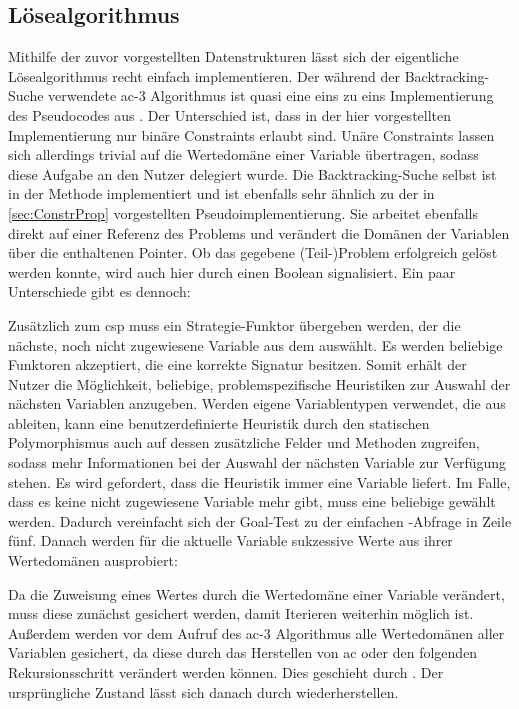 \subsection{Lösealgorithmus}
Mithilfe der zuvor vorgestellten Datenstrukturen lässt sich der eigentliche Lösealgorithmus recht einfach implementieren. Der während der Backtracking-Suche verwendete \ac*{ac}-3
Algorithmus ist quasi eine eins zu eins Implementierung des Pseudocodes aus \cite{ac3}. Der Unterschied ist, dass in der hier vorgestellten Implementierung nur binäre Constraints
erlaubt sind. Unäre Constraints lassen sich allerdings trivial auf die Wertedomäne einer Variable übertragen, sodass diese Aufgabe an den Nutzer delegiert wurde.
Die Backtracking-Suche selbst ist in der Methode  implementiert und ist ebenfalls sehr ähnlich zu der in \cref{sec:ConstrProp} vorgestellten
Pseudoimplementierung. Sie arbeitet ebenfalls direkt auf einer Referenz des Problems und verändert die Domänen der Variablen über die enthaltenen Pointer. Ob das gegebene
(Teil-)Problem erfolgreich gelöst werden konnte, wird auch hier durch einen Boolean signalisiert. Ein paar Unterschiede gibt es dennoch:

Zusätzlich zum \ac*{csp} muss ein Strategie-Funktor übergeben werden, der die nächste, noch nicht zugewiesene Variable aus dem  auswählt. Es werden beliebige
Funktoren akzeptiert, die eine korrekte Signatur besitzen. Somit erhält der Nutzer die Möglichkeit, beliebige, problemspezifische Heuristiken zur Auswahl der nächsten Variablen
anzugeben. Werden eigene Variablentypen verwendet, die aus  ableiten, kann eine benutzerdefinierte Heuristik durch den statischen Polymorphismus auch auf
dessen zusätzliche Felder und Methoden zugreifen, sodass mehr Informationen bei der Auswahl der nächsten Variable zur Verfügung stehen. Es wird gefordert, dass die Heuristik
immer eine Variable liefert. Im Falle, dass es keine nicht zugewiesene Variable mehr gibt, muss eine beliebige gewählt werden. Dadurch vereinfacht sich der Goal-Test zu der
einfachen -Abfrage in Zeile fünf. Danach werden für die aktuelle Variable sukzessive Werte aus ihrer Wertedomänen ausprobiert:

Da die Zuweisung eines Wertes durch  die Wertedomäne einer Variable verändert, muss diese zunächst gesichert werden, damit Iterieren weiterhin möglich ist.
Außerdem werden vor dem Aufruf des \ac*{ac}-3 Algorithmus alle Wertedomänen aller Variablen gesichert, da diese durch das Herstellen von \ac*{ac} oder den folgenden
Rekursionsschritt verändert werden können. Dies geschieht durch . Der ursprüngliche Zustand lässt sich danach durch
 wiederherstellen.

